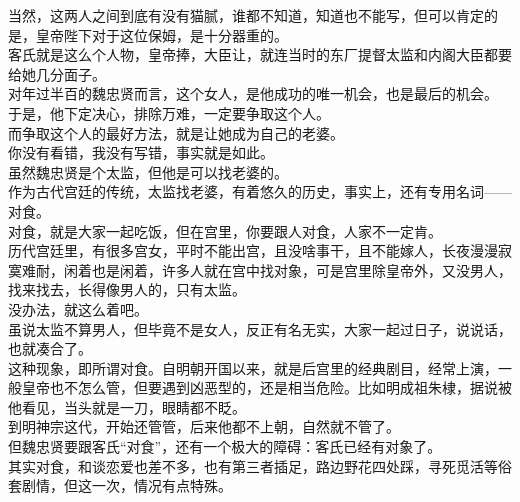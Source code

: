 \begin{multicols}{\theparacolNo}
当然，这两人之间到底有没有猫腻，谁都不知道，知道也不能写，但可以肯定的是，皇帝陛下对于这位保姆，是十分器重的。\\

客氏就是这么个人物，皇帝捧，大臣让，就连当时的东厂提督太监和内阁大臣都要给她几分面子。\\

对年过半百的魏忠贤而言，这个女人，是他成功的唯一机会，也是最后的机会。\\

于是，他下定决心，排除万难，一定要争取这个人。\\

而争取这个人的最好方法，就是让她成为自己的老婆。\\

你没有看错，我没有写错，事实就是如此。\\

虽然魏忠贤是个太监，但他是可以找老婆的。\\

作为古代宫廷的传统，太监找老婆，有着悠久的历史，事实上，还有专用名词——对食。\\

对食，就是大家一起吃饭，但在宫里，你要跟人对食，人家不一定肯。\\

历代宫廷里，有很多宫女，平时不能出宫，且没啥事干，且不能嫁人，长夜漫漫寂寞难耐，闲着也是闲着，许多人就在宫中找对象，可是宫里除皇帝外，又没男人，找来找去，长得像男人的，只有太监。\\

没办法，就这么着吧。\\

虽说太监不算男人，但毕竟不是女人，反正有名无实，大家一起过日子，说说话，也就凑合了。\\

这种现象，即所谓对食。自明朝开国以来，就是后宫里的经典剧目，经常上演，一般皇帝也不怎么管，但要遇到凶恶型的，还是相当危险。比如明成祖朱棣，据说被他看见，当头就是一刀，眼睛都不眨。\\

到明神宗这代，开始还管管，后来他都不上朝，自然就不管了。\\

但魏忠贤要跟客氏“对食”，还有一个极大的障碍：客氏已经有对象了。\\

其实对食，和谈恋爱也差不多，也有第三者插足，路边野花四处踩，寻死觅活等俗套剧情，但这一次，情况有点特殊。\\


\end{multicols}
